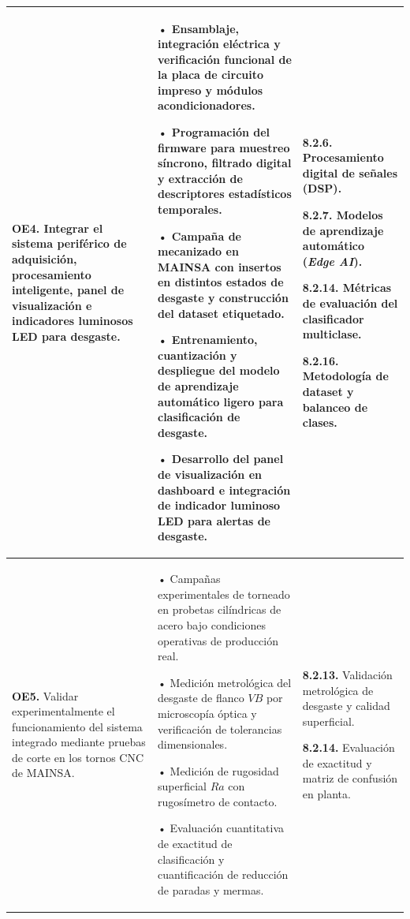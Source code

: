 {\begin{longtable}{|>{\raggedright\arraybackslash}p{3.3cm}|>{\raggedright\arraybackslash}p{5.2cm}|>{\raggedright\arraybackslash}p{5.2cm}|}
\textbf{OE4.} Integrar el sistema periférico de adquisición, procesamiento inteligente, panel de visualización e indicadores luminosos LED para desgaste. &
• Ensamblaje, integración eléctrica y verificación funcional de la placa de circuito impreso y módulos acondicionadores.\par\vspace{1mm}
• Programación del firmware para muestreo síncrono, filtrado digital y extracción de descriptores estadísticos temporales.\par\vspace{1mm}
• Campaña de mecanizado en MAINSA con insertos en distintos estados de desgaste y construcción del dataset etiquetado.\par\vspace{1mm}
• Entrenamiento, cuantización y despliegue del modelo de aprendizaje automático ligero para clasificación de desgaste.\par\vspace{1mm}
• Desarrollo del panel de visualización en dashboard e integración de indicador luminoso LED para alertas de desgaste. &
\textbf{8.2.6.} Procesamiento digital de señales (DSP).\par\vspace{1mm}
\textbf{8.2.7.} Modelos de aprendizaje automático (\textit{Edge AI}).\par\vspace{1mm}
\textbf{8.2.14.} Métricas de evaluación del clasificador multiclase.\par\vspace{1mm}
\textbf{8.2.16.} Metodología de dataset y balanceo de clases. \\ \hline

\textbf{OE5.} Validar experimentalmente el funcionamiento del sistema integrado mediante pruebas de corte en los tornos CNC de MAINSA. &
• Campañas experimentales de torneado en probetas cilíndricas de acero bajo condiciones operativas de producción real.\par\vspace{1mm}
• Medición metrológica del desgaste de flanco $VB$ por microscopía óptica y verificación de tolerancias dimensionales.\par\vspace{1mm}
• Medición de rugosidad superficial $Ra$ con rugosímetro de contacto.\par\vspace{1mm}
• Evaluación cuantitativa de exactitud de clasificación y cuantificación de reducción de paradas y mermas. &
\textbf{8.2.13.} Validación metrológica de desgaste y calidad superficial.\par\vspace{1mm}
\textbf{8.2.14.} Evaluación de exactitud y matriz de confusión en planta. \\ \hline

\end{longtable}
}


